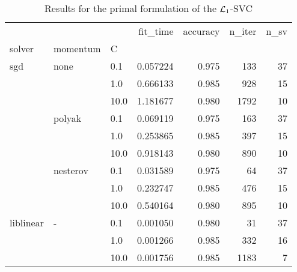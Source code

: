 \begin{table}[H]
\centering
\caption{Results for the primal formulation of the $\protect \mathcal{L}_1$-SVC}
\label{primal_l1_svc_cv_results}
\begin{tabular}{lllrrrr}
\toprule
          &   &      &  fit\_time &  accuracy &  n\_iter &  n\_sv \\
solver & momentum & C &           &           &         &       \\
\midrule
sgd & none & 0.1  &  0.057224 &     0.975 &     133 &    37 \\
          &   & 1.0  &  0.666133 &     0.985 &     928 &    15 \\
          &   & 10.0 &  1.181677 &     0.980 &    1792 &    10 \\
          & polyak & 0.1  &  0.069119 &     0.975 &     163 &    37 \\
          &   & 1.0  &  0.253865 &     0.985 &     397 &    15 \\
          &   & 10.0 &  0.918143 &     0.980 &     890 &    10 \\
          & nesterov & 0.1  &  0.031589 &     0.975 &      64 &    37 \\
          &   & 1.0  &  0.232747 &     0.985 &     476 &    15 \\
          &   & 10.0 &  0.540164 &     0.980 &     895 &    10 \\
liblinear & - & 0.1  &  0.001050 &     0.980 &      31 &    37 \\
          &   & 1.0  &  0.001266 &     0.985 &     332 &    16 \\
          &   & 10.0 &  0.001756 &     0.985 &    1183 &     7 \\
\bottomrule
\end{tabular}
\end{table}
